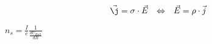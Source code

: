 
\begin{align}
	\vec{\j} = \mathbf{\sigma} \cdot \vec{E} & & \Leftrightarrow & & \vec{E} = \mathbf{\rho} \cdot \vec{j}
	\label{eq:u2rho}
\end{align}



$n_s=\frac{I}{e}\frac{1}{\frac{dU_{Hall}}{dB}}$
\label{Formel Ladungsträgerdichte aus Steigung}
